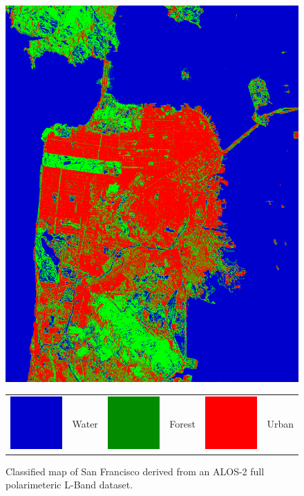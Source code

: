 \begin{figure}[tbp]
\centering
\includegraphics[width=0.5\columnwidth]{Figures/ALOS2_SF_3Class/Output_AL2_500k_alt}



		\begin{tabular}{clclcl}
					\includegraphics[width=0.03\columnwidth]{Figures/RS2_SF_3Class/Blue.png} & Water &		\includegraphics[width=0.03\columnwidth]{Figures/RS2_SF_3Class/Green.png} & Forest &  	\includegraphics[width=0.03\columnwidth]{Figures/RS2_SF_3Class/Red.png} &  Urban 
		\end{tabular}
		
		\caption{Classified map of San Francisco derived from an ALOS-2 full polarimeteric L-Band dataset.}
		
\label{fig:compwal2}
\end{figure}












